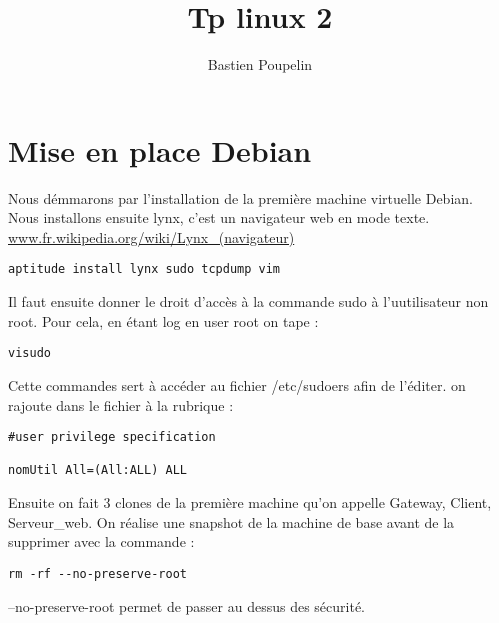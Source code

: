 \documentclass[a4paper,12pt]{article}
\title{Tp linux 2}
\author{Bastien Poupelin}
\begin{document}
\maketitle

\clearpage

\section{Mise en place Debian}

Nous démmarons par l'installation de la première machine virtuelle Debian.\\
Nous installons ensuite lynx, c'est un navigateur web en mode texte.
\url{www.fr.wikipedia.org/wiki/Lynx_(navigateur)}
\begin{verbatim}
aptitude install lynx sudo tcpdump vim
\end{verbatim}

Il faut ensuite donner le droit d'accès à la commande sudo à l'uutilisateur non root.
Pour cela, en étant log en user root on tape :
\begin{verbatim}
visudo
\end{verbatim}
Cette commandes sert à accéder au fichier /etc/sudoers afin de l'éditer.
on rajoute dans le fichier à la rubrique : 
\begin{verbatim}
#user privilege specification

nomUtil	All=(All:ALL) ALL
\end{verbatim}
Ensuite on fait 3 clones de la première machine qu'on appelle Gateway, Client, Serveur\_web.
On réalise une snapshot de la machine de base avant de la supprimer avec la commande :
\begin{verbatim}
rm -rf --no-preserve-root
\end{verbatim}
--no-preserve-root permet de passer au dessus des sécurité.
\end{document}
